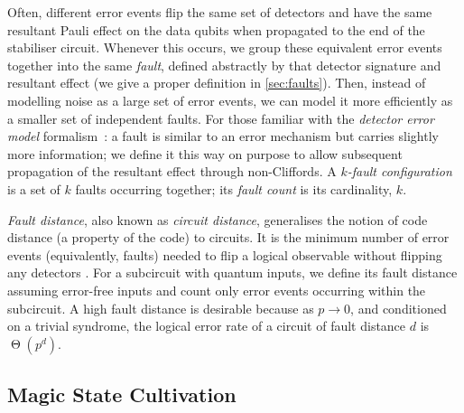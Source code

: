 Often, different error events
	flip the same set of detectors
	and have the same resultant Pauli effect on the data qubits
		when propagated to the end of the stabiliser circuit.
Whenever this occurs,
we group these equivalent error events together
into the same \emph{fault},
defined abstractly by that detector signature and resultant effect
(we give a proper definition in \cref{sec:faults}).
Then, instead of modelling noise as a large set of error events,
we can model it more efficiently as a smaller set of independent faults.
For those familiar with the \emph{detector error model} formalism~\cite{Gidney2021a}:
a fault is similar to an error mechanism
but carries slightly more information;
we define it this way on purpose to allow
subsequent propagation of the resultant effect through non-Cliffords.
A \emph{$k$-fault configuration} is a set of $k$ faults occurring together;
its \emph{fault count} is its cardinality, $k$.

\emph{Fault distance},
also known as \emph{circuit distance},
generalises the notion of code distance
(a property of the code) to circuits.
It is the minimum number of error events
(equivalently, faults)
needed to flip a logical observable
without flipping any detectors \cite[\S 3.1]{Gidney2024}.
For a subcircuit with quantum inputs,
we define its fault distance assuming error-free inputs
and count only error events occurring within the subcircuit.
A high fault distance is desirable because
as $p \to 0$, and conditioned on a trivial syndrome,
the logical error rate of a circuit of fault distance $d$ is $\upTheta(p^d)$.

\subsection{Magic State Cultivation}
\label{sec:magic_state_cultivation}

